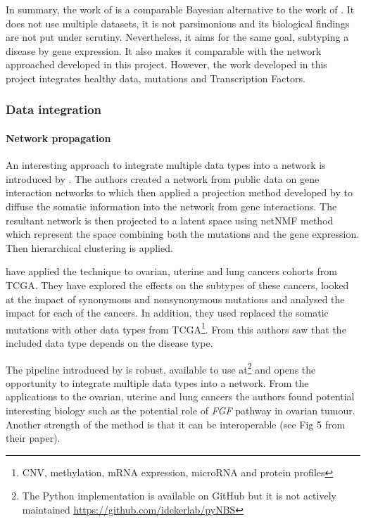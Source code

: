In summary, the work of \citet{Nakazawa2021-yq} is a comparable Bayesian alternative to the work of \citet{Care2019-ij}. It does not use multiple datasets, it is not parsimonious and its biological findings are not put under scrutiny. Nevertheless, it aims for the same goal, subtyping a disease by gene expression. It also makes it comparable with the network approached developed in this project. However, the work developed in this project integrates healthy data, mutations and Transcription Factors.




\subsubsection{Data integration} \label{s:lit:net_data_int}


\paragraph*{Network propagation} \label{s:lit:net_prop}

An interesting approach to integrate multiple data types into a network is introduced by  \citet{Hofree2013-ld}. The authors created a network from public data on gene interaction networks \cite{Szklarczyk2019-pu, Cerami2011-ql, Lee2011-xj} to which then applied a projection method developed by \citet{Vanunu2010-el} to diffuse the somatic information into the network from gene interactions. The resultant network is then projected to a latent space using netNMF method \citet{Cai2008-fv} which represent the space combining both the mutations and the gene expression. Then hierarchical clustering is applied.

\citet{Hofree2013-ld} have applied the technique to ovarian, uterine and lung cancers cohorts from TCGA. They have explored the effects on the subtypes of these cancers, looked at the impact of synonymous and nonsynonymous mutations and analysed the impact for each of the cancers. In addition, they used replaced the somatic mutations with other data types from TCGA\footnote{CNV, methylation, mRNA expression, microRNA and protein profiles}. From this authors saw that the included data type depends on the disease type.

The pipeline introduced by \citet{Hofree2013-ld} is robust, available to use at\footnote{The Python implementation is available on GitHub but it is not actively maintained \url{https://github.com/idekerlab/pyNBS}} and opens the opportunity to integrate multiple data types into a network. From the applications to the ovarian, uterine and lung cancers the authors found potential interesting biology such as the potential role of \textit{FGF} pathway in ovarian tumour. Another strength of the method is that it can be interoperable (see Fig 5 from their paper).

